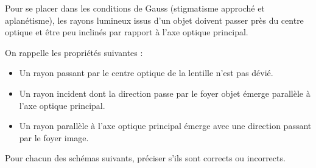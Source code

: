 \reponse{\reponseB{}}

\begin{corrigeNewpage}
Pour se placer dans les conditions de Gauss (stigmatisme approché et aplanétisme), les rayons lumineux issus d'un objet doivent passer près du centre optique et être peu inclinés par rapport à l'axe optique principal.
\end{corrigeNewpage}


\finEntrainement







\hauteurLargeurCadreReponse		{8mm}{2cm}
\initialisationEntrainement

On rappelle les propriétés suivantes :
\begin{itemize}
\item Un rayon passant par le centre optique de la lentille n'est pas dévié. 
\item Un rayon incident dont la direction passe par le foyer objet émerge parallèle à l'axe optique principal. 
\item Un rayon parallèle à l'axe optique principal émerge avec une direction passant par le foyer image. 
\end{itemize}

\vspace*{0.3cm}
Pour chacun des schémas suivants, préciser s'ils sont corrects ou incorrects.\\

\debutEntrainement

